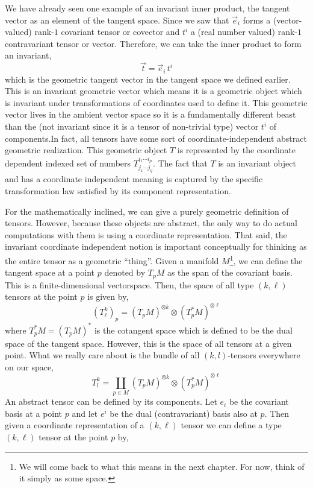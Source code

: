 \documentclass[11pt, a4paper]{article}
\begin{document}
We have already seen one example of an invariant inner product, the tangent vector as an element of the tangent space. Since we saw that $\vec{e}_i$ forms a (vector-valued) rank-$1$ covariant tensor or covector and $t^i$ a (real number valued) rank-$1$ contravariant tensor or vector. Therefore, we can take the inner product to form an invariant,
\[ \vec{t} = \vec{e}_i \, t^i \] 
which is the geometric tangent vector in the tangent space we defined earlier. This is an invariant geometric vector which means it is a geometric object which is invariant under transformations of coordinates used to define it. This geometric vector lives in the ambient vector space so it is a fundamentally different beast than the (not invariant since it is a tensor of non-trivial type) vector $t^i$ of components.In fact, all tensors have some sort of coordinate-independent abstract geometric realization. This geometric object $T$ is represented by the coordinate dependent indexed set of numbers $T^{i_1 \cdots i_p}_{j_1 \cdots j_q}$. The fact that $T$ is an invariant object and has a coordinate independent meaning is captured by the specific transformation law satisfied by its component representation. 
\par
For the mathematically inclined, we can give a purely geometric definition of tensors. However, because these objects are abstract, the only way to do actual computations with them is using a coordinate representation. That said, the invariant coordinate independent notion is important conceptually for thinking as the entire tensor as a geometric ``thing''. Given a manifold $M$\footnote{We will come back to what this means in the next chapter. For now, think of it simply as some space.}, we can define the tangent space at a point $p$ denoted by $T_p M$ as the span of the covariant basis. This is a finite-dimensional vectorspace. Then, the space of all type $(k, \ell)$ tensors at the point $p$ is given by,
\[ (T^k_\ell)_p = (T_p M)^{\otimes k} \otimes (T^*_p M)^{\otimes \ell}\]
where $T_p^* M = (T_p M)^*$ is the cotangent space which is defined to be the dual space of the tangent space. However, this is the space of all tensors at a given point. What we really care about is the bundle of all $(k,l)$-tensors everywhere on our space,
\[T^k_l = \coprod_{p \in M} (T_p M)^{\otimes k} \otimes (T^*_p M)^{\otimes \ell}\]
An abstract tensor can be defined by its components. Let $e_i$ be the covariant basis at a point $p$ and let $e^i$ be the dual (contravariant) basis also at $p$. Then given a coordinate representation of a $(k, \ell)$ tensor we can define a type $(k, \ell)$ tensor at the point $p$ by,
\end{document}
